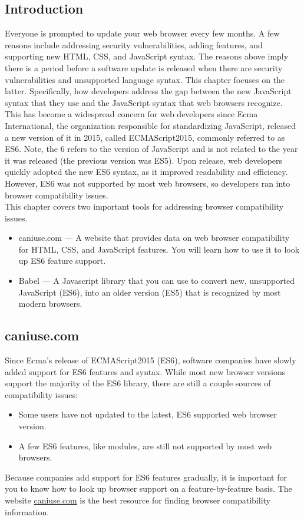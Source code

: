 \documentclass[11pt]{article}
\begin{document}
\subsection{Introduction}
Everyone is prompted to update your web browser every few months. A few reasons include addressing security vulnerabilities, adding features, and supporting new HTML, CSS, and JavaScript syntax. The reasons above imply there is a period before a software update is released when there are security vulnerabilities and unsupported language syntax. This chapter focuses on the latter. Specifically, how developers address the gap between the new JavaScript syntax that they use and the JavaScript syntax that web browsers recognize. \\
\newline
This has become a widespread concern for web developers since Ecma International, the organization responsible for standardizing JavaScript, released a new version of it in 2015, called ECMAScript2015, commonly referred to as ES6. Note, the 6 refers to the version of JavaScript and is not related to the year it was released (the previous version was ES5). Upon release, web developers quickly adopted the new ES6 syntax, as it improved readability and efficiency. However, ES6 was not supported by most web browsers, so developers ran into browser compatibility issues. \\
\newline 
This chapter covers two important tools for addressing browser compatibility issues.
\begin{itemize}[leftmargin = *]
\item caniuse.com — A website that provides data on web browser compatibility for HTML, CSS, and JavaScript features. You will learn how to use it to look up ES6 feature support.
\item Babel — A Javascript library that you can use to convert new, unsupported JavaScript (ES6), into an older version (ES5) that is recognized by most modern browsers.
\end{itemize}

\subsection{caniuse.com}
Since Ecma’s release of ECMAScript2015 (ES6), software companies have slowly added support for ES6 features and syntax. While most new browser versions support the majority of the ES6 library, there are still a couple sources of compatibility issues:
\begin{itemize}[leftmargin = *]
\item Some users have not updated to the latest, ES6 supported web browser version.
\item A few ES6 features, like modules, are still not supported by most web browsers.
\end{itemize}
Because companies add support for ES6 features gradually, it is important for you to know how to look up browser support on a feature-by-feature basis. The website \href{https://caniuse.com/}{caniuse.com} is the best resource for finding browser compatibility information.
\end{document}
